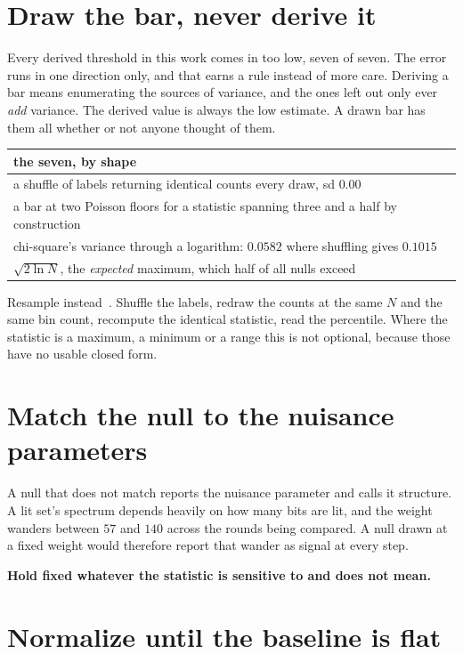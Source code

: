 \section{Draw the bar, never derive it}

Every derived threshold in this work comes in too low, seven of seven. The error runs in one direction only, and that earns a rule instead of more care. Deriving a bar means enumerating the sources of variance, and the ones left out only ever \emph{add} variance. The derived value is always the low estimate. A drawn bar has them all whether or not anyone thought of them.

\begin{center}
\begin{tabular}{@{}l@{}}
\toprule
the seven, by shape \\
\midrule
a shuffle of labels returning identical counts every draw, sd \(0.00\) \\
a bar at two Poisson floors for a statistic spanning three and a half by construction \\
chi-square's variance through a logarithm: \(0.0582\) where shuffling gives \(0.1015\) \\
\(\sqrt{2 \ln N}\), the \emph{expected} maximum, which half of all nulls exceed \\
\bottomrule
\end{tabular}
\end{center}

Resample instead~\cite{src:Westfall-and-Young-1993}. Shuffle the labels, redraw the counts at the same \(N\) and the same bin count, recompute the identical statistic, read the percentile. Where the statistic is a maximum, a minimum or a range this is not optional, because those have no usable closed form.

\section{Match the null to the nuisance parameters}

A null that does not match reports the nuisance parameter and calls it structure. A lit set's spectrum depends heavily on how many bits are lit, and the weight wanders between \(57\) and \(140\) across the rounds being compared. A null drawn at a fixed weight would therefore report that wander as signal at every step.

\textbf{Hold fixed whatever the statistic is sensitive to and does not mean.}

\section{Normalize until the baseline is flat}

